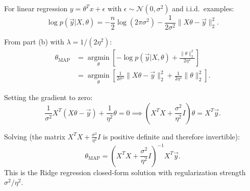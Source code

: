 \begin{answer}
For linear regression $y = \theta^T x + \epsilon$ with $\epsilon \sim \mathcal{N}(0,\sigma^2)$ and i.i.d.\ examples:
$$\log p(\vec{y}|X,\theta) = -\frac{n}{2}\log(2\pi\sigma^2) - \frac{1}{2\sigma^2}\|X\theta - \vec{y}\|_2^2.$$

From part (b) with $\lambda = 1/(2\eta^2)$:
\begin{align*}
\theta_{\mathrm{MAP}} &= \operatorname*{argmin}_\theta \left[-\log p(\vec{y}|X,\theta) + \frac{\|\theta\|_2^2}{2\eta^2}\right]\\
&= \operatorname*{argmin}_\theta \left[\frac{1}{2\sigma^2}\|X\theta - \vec{y}\|_2^2 + \frac{1}{2\eta^2}\|\theta\|_2^2\right].
\end{align*}

Setting the gradient to zero:
$$\frac{1}{\sigma^2}X^T(X\theta - \vec{y}) + \frac{1}{\eta^2}\theta = 0 \implies \left(X^TX + \frac{\sigma^2}{\eta^2}I\right)\theta = X^T\vec{y}.$$

Solving (the matrix $X^TX + \frac{\sigma^2}{\eta^2}I$ is positive definite and therefore invertible):
$$\boxed{\theta_{\mathrm{MAP}} = \left(X^TX + \frac{\sigma^2}{\eta^2}I\right)^{-1}X^T\vec{y}.}$$
This is the Ridge regression closed-form solution with regularization strength $\sigma^2/\eta^2$.
\end{answer}
